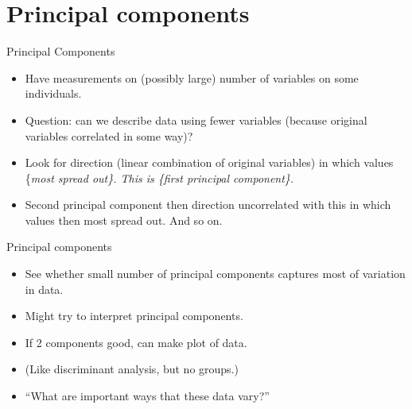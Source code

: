 \documentclass[ignorenonframetext,]{beamer}
\begin{document}
\hypertarget{principal-components}{%
\section{Principal components}\label{principal-components}}

\begin{frame}{Principal Components}
\protect\hypertarget{principal-components-1}{}

\begin{itemize}
\item
  Have measurements on (possibly large) number of variables on some
  individuals.
\item
  Question: can we describe data using fewer variables (because original
  variables correlated in some way)?
\item
  Look for direction (linear combination of original variables) in which
  values \{\em most spread out\}. This is
  \{\em first principal component\}.
\item
  Second principal component then direction uncorrelated with this in
  which values then most spread out. And so on.
\end{itemize}

\end{frame}

\begin{frame}{Principal components}
\protect\hypertarget{principal-components-2}{}

\begin{itemize}
\item
  See whether small number of principal components captures most of
  variation in data.
\item
  Might try to interpret principal components.
\item
  If 2 components good, can make plot of data.
\item
  (Like discriminant analysis, but no groups.)
\item
  ``What are important ways that these data vary?''
\end{itemize}

\end{frame}
\end{document}
